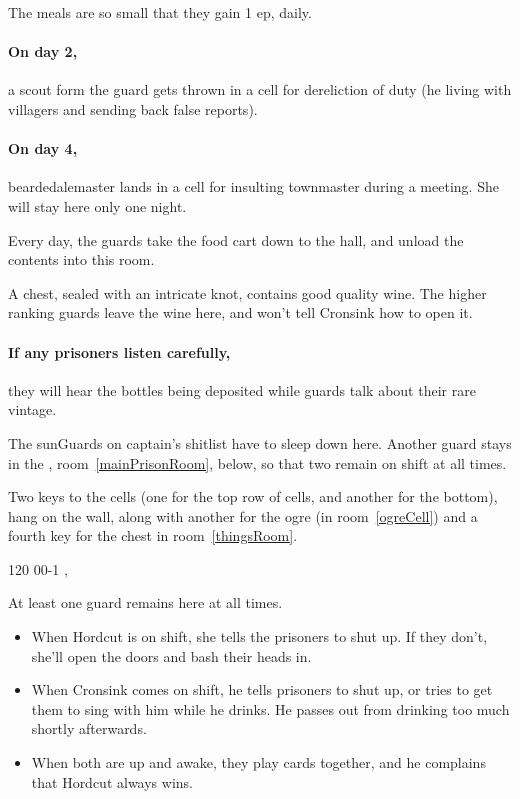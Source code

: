 \begin{multicols}{2}
The meals are so small that they gain 1 \gls{ep}, daily.

\paragraph{On day 2,}
a scout form the \gls{guard} gets thrown in a cell for dereliction of duty (he living with villagers and sending back false reports).

\paragraph{On day 4,}
\gls{beardedalemaster} lands in a cell for insulting \gls{townmaster} during a meeting.
She will stay here only one night.


Every day, the guards take the food cart down to the hall, and unload the contents into this room.

A chest, sealed with an intricate knot, contains good quality wine.
The higher ranking guards leave the wine here, and won't tell Cronsink how to open it.

\paragraph{If any prisoners listen carefully,}
they will hear the bottles being deposited while guards talk about their rare vintage.


The \glspl{sunGuard} on \gls{captain}'s shitlist have to sleep down here.
Another guard stays in the , room~\ref{mainPrisonRoom}, below, so that two remain on shift at all times.

Two keys to the cells (one for the top row of cells, and another for the bottom), hang on the wall, along with another for the \gls{ogre} (in room~\ref{ogreCell}) and a fourth key for the chest in room~\ref{thingsRoom}.

%
  {{1}{2}{0}}%
  {{0}{0}{-1}}%
  {%
    \shortsword
    \partialplate
  }%
  {\brawler, \berserker}%
  {\lootSmall}%
  {}%


At least one guard remains here at all times.
\begin{itemize}
  \item
  When Hordcut is on shift, she tells the prisoners to shut up.
  If they don't, she'll open the doors and bash their heads in.
  \item
  When Cronsink comes on shift, he tells prisoners to shut up, or tries to get them to sing with him while he drinks.
  He passes out from drinking too much shortly afterwards.
  \item
  When both are up and awake, they play cards together, and he complains that Hordcut always wins.
\end{itemize}


\end{multicols}
